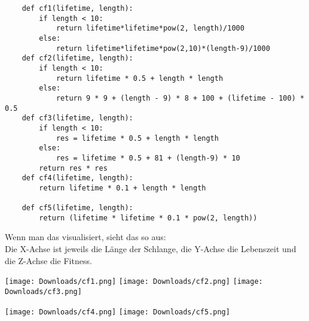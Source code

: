 \documentclass[10pt,a4paper,ngerman,english]{article}
\begin{document}

\begin{lstlisting}
    def cf1(lifetime, length):
        if length < 10:
            return lifetime*lifetime*pow(2, length)/1000
        else:
            return lifetime*lifetime*pow(2,10)*(length-9)/1000
    def cf2(lifetime, length):
        if length < 10:
            return lifetime * 0.5 + length * length
        else:
            return 9 * 9 + (length - 9) * 8 + 100 + (lifetime - 100) * 0.5
    def cf3(lifetime, length):
        if length < 10:
            res = lifetime * 0.5 + length * length
        else:
            res = lifetime * 0.5 + 81 + (length-9) * 10
        return res * res
    def cf4(lifetime, length):
        return lifetime * 0.1 + length * length

    def cf5(lifetime, length):
        return (lifetime * lifetime * 0.1 * pow(2, length))
\end{lstlisting}

Wenn man das visualisiert, sieht das so aus:\\
Die X-Achse ist jeweils die Länge der Schlange, die Y-Achse die Lebenszeit und die Z-Achse die Fitness.

\begin{center}
    \texttt{[image: Downloads/cf1.png]}
    \texttt{[image: Downloads/cf2.png]}
    \texttt{[image: Downloads/cf3.png]}
\end{center}


\begin{center}
    \texttt{[image: Downloads/cf4.png]}
    \texttt{[image: Downloads/cf5.png]}
\end{center}
\end{document}
